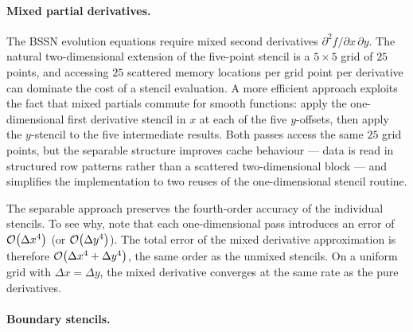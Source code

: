 \paragraph{Mixed partial derivatives.}

The BSSN evolution equations require mixed second derivatives
$\partial^2 f/\partial x\,\partial y$.  The natural two-dimensional extension
of the five-point stencil is a $5 \times 5$ grid of $25$ points, and
accessing $25$ scattered memory locations per grid point per derivative can
dominate the cost of a stencil evaluation.  A more efficient approach exploits
the fact that mixed partials commute for smooth functions: apply the
one-dimensional first derivative stencil in $x$ at each of the five
$y$-offsets, then apply the $y$-stencil to the five intermediate results.
Both passes access the same $25$ grid points, but the separable structure
improves cache behaviour --- data is read in structured row patterns rather
than a scattered two-dimensional block --- and simplifies the implementation
to two reuses of the one-dimensional stencil routine.

The separable approach preserves the fourth-order accuracy of the individual
stencils.  To see why, note that each one-dimensional pass introduces an error
of $\mathcal{O}\!\left(\Delta x^4\right)$ (or $\mathcal{O}\!\left(\Delta y^4\right)$).  The total error of the
mixed derivative approximation is therefore
$\mathcal{O}\!\left(\Delta x^4 + \Delta y^4\right)$, the same order as the unmixed stencils.
On a uniform grid with $\Delta x = \Delta y$, the mixed derivative
converges at the same rate as the pure derivatives.

\paragraph{Boundary stencils.}

